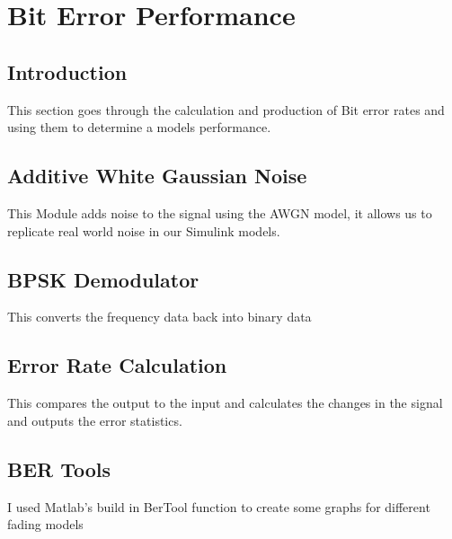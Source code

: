 \section{Bit Error Performance}{
    \subsection{Introduction}
    {
   		This section goes through the calculation and production of Bit error rates and using them to determine a models performance.
   	}
   	\subsection{Additive White Gaussian Noise}
   	{
   		This Module adds noise to the signal using the AWGN model, it allows us to replicate real world noise in our Simulink models.
	}
	\subsection{BPSK Demodulator}
	{
		This converts the frequency data back into binary data
	}
	\subsection{Error Rate Calculation}
	{
		This compares the output to the input and calculates the changes in the signal and outputs the error statistics.
	}
	\subsection{BER Tools}
	{
		I used Matlab's build in BerTool function to create some graphs for different fading models
	}
}